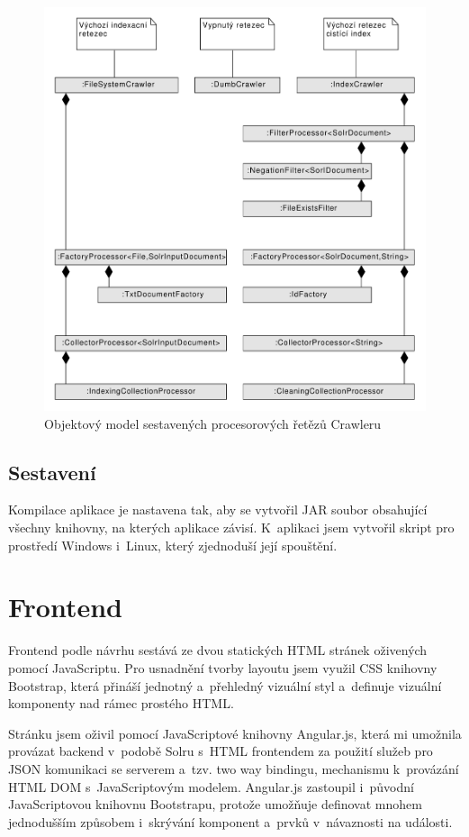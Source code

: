 \begin{figure}[h]
\begin{center}
\includegraphics[width=13cm]{ProcessorChain}
\caption{Objektový model sestavených procesorových řetězů Crawleru}
\label{fig:ProcessorChain}
\end{center}
\end{figure}


\subsection{Sestavení}
Kompilace aplikace je nastavena tak, aby se vytvořil JAR soubor obsahující všechny knihovny, na kterých aplikace závisí. K~aplikaci jsem vytvořil skript pro prostředí Windows i~Linux, který zjednoduší její spouštění.

\section{Frontend}
Frontend podle návrhu sestává ze dvou statických HTML stránek oživených pomocí JavaScriptu. Pro usnadnění tvorby layoutu jsem využil CSS knihovny Bootstrap\cite{bootstrap}, která přináší jednotný a~přehledný vizuální styl a~definuje vizuální komponenty nad rámec prostého HTML.

Stránku jsem oživil pomocí JavaScriptové knihovny Angular.js\cite{angular}, která mi umožnila provázat backend v~podobě Solru s~HTML frontendem za použití služeb pro JSON komunikaci se serverem a~tzv. two way bindingu, mechanismu k~provázání HTML DOM s~JavaScriptovým modelem. Angular.js zastoupil i~původní JavaScriptovou knihovnu Bootstrapu, protože umožňuje definovat mnohem jednodušším způsobem i~skrývání komponent a~prvků v~návaznosti na události.

